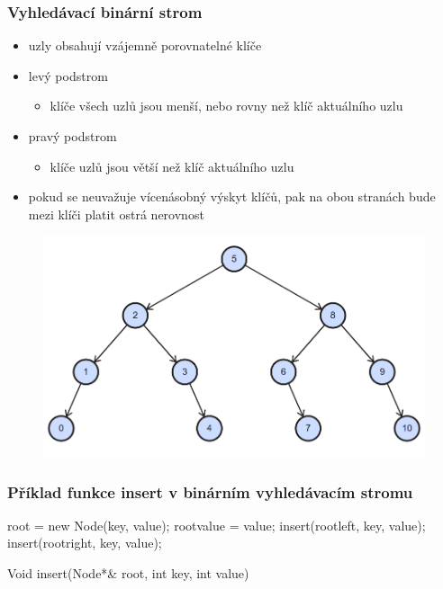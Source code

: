 \documentclass{beamer}
\begin{document}
\begin{frame}
\frametitle{Vyhledávací binární strom}
\begin{itemize}
\item uzly obsahují vzájemně porovnatelné klíče
\item levý podstrom 
\begin{itemize}
\item klíče všech uzlů jsou menší, nebo rovny než klíč aktuálního uzlu
\end{itemize}

\item pravý podstrom
\begin{itemize}
\item klíče uzlů jsou větší než klíč aktuálního uzlu
\end{itemize}
\item pokud se neuvažuje vícenásobný výskyt klíčů, pak na obou stranách bude mezi klíči platit ostrá nerovnost
\end{itemize}
\begin{figure}
\includegraphics[scale=0.4]{VBS}
\end{figure}
\end{frame}
\begin{frame}
\frametitle{Příklad funkce insert v binárním vyhledávacím stromu}
\begin{algorithm}[H]
    \SetNlSty{}{}{:}
    \SetNlSkip{-1.15em}
    \Indp\Indpp
    {
        root = new Node(key, value);
    }
    {
        root\textrightarrow value = value;
    }
    {
        insert(root\textrightarrow left, key, value);
    }
    \uElse
    {
        insert(root\textrightarrow right, key, value);
    }
    \caption{Void insert(Node*\& root, int key, int value)}
\end{algorithm}
\end{frame}
\end{document}
